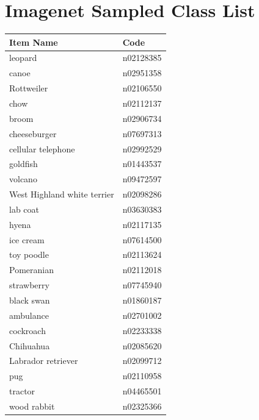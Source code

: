 \documentclass{article}
\begin{document}
    \section{Imagenet Sampled Class List}
        \begin{longtable}{@{}ll@{}} %
            \toprule %
            \textbf{Item Name} & \textbf{Code} \\
            \midrule %
            \endhead %
            \bottomrule %
            \endfoot %
            
            leopard & n02128385 \\
            canoe & n02951358 \\
            Rottweiler & n02106550 \\
            chow & n02112137 \\
            broom & n02906734 \\
            cheeseburger & n07697313 \\
            cellular telephone & n02992529 \\
            goldfish & n01443537 \\
            volcano & n09472597 \\
            West Highland white terrier & n02098286 \\
            lab coat & n03630383 \\
            hyena & n02117135 \\
            ice cream & n07614500 \\
            toy poodle & n02113624 \\
            Pomeranian & n02112018 \\
            strawberry & n07745940 \\
            black swan & n01860187 \\
            ambulance & n02701002 \\
            cockroach & n02233338 \\
            Chihuahua & n02085620 \\
            Labrador retriever & n02099712 \\
            pug & n02110958 \\
            tractor & n04465501 \\
            wood rabbit & n02325366 \\

\end{longtable}
\end{document}
